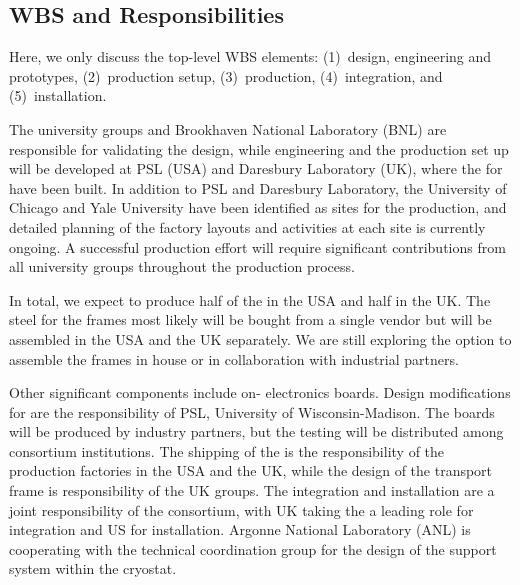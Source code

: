 \subsection{WBS and Responsibilities}
\label{sec:fdsp-apa-org-wbs}

Here, we only discuss the top-level WBS elements: (1)~design, engineering and prototypes, (2)~production setup, (3)~production, (4)~integration, and (5)~installation.

The university groups and Brookhaven National Laboratory (BNL) are responsible for validating  the design, while engineering and the production set up will be developed at PSL %
(USA) and Daresbury Laboratory (UK), where the  for  have been built. 
In addition to PSL and Daresbury Laboratory, the University of Chicago and Yale University have been identified as sites for the production, and detailed planning of the factory layouts and activities at each site is currently ongoing. A successful production effort will require significant contributions from all university groups throughout the production process.

In total, we expect to produce half of the  in the USA and half in the UK. The steel for the frames most likely will be bought from a single vendor but will be assembled in the USA and the UK separately. We are still exploring the option to assemble the frames in house or in collaboration with industrial partners. 

Other significant components include on- electronics boards. Design modifications for  are the responsibility of PSL, University of Wisconsin-Madison. The boards will be produced by industry partners, but the testing will be distributed among consortium institutions. The shipping of the  is the responsibility of the production factories in the USA and the UK, while the design of the  transport frame is responsibility of the UK groups. The integration and installation are a joint responsibility of the consortium, with UK taking the a leading role for integration and US for installation. Argonne National Laboratory (ANL) is cooperating with the technical coordination group for the design of the  support system within the cryostat.
